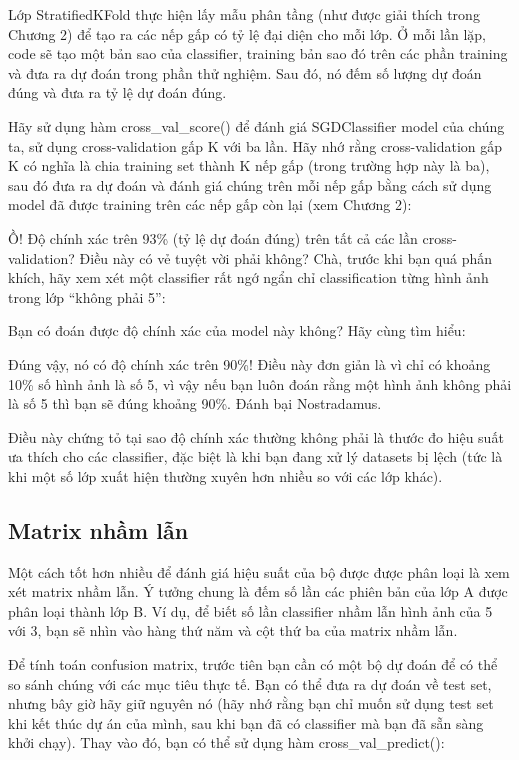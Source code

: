 Lớp StratifiedKFold thực hiện lấy mẫu phân tầng (như được giải thích trong Chương 2) để tạo ra các nếp gấp có tỷ lệ đại diện cho mỗi lớp. Ở mỗi lần lặp, code sẽ tạo một bản sao của classifier, training bản sao đó trên các phần training và đưa ra dự đoán trong phần thử nghiệm. Sau đó, nó đếm số lượng dự đoán đúng và đưa ra tỷ lệ dự đoán đúng.

Hãy sử dụng hàm cross\_val\_score() để đánh giá SGDClassifier model của chúng ta, sử dụng cross-validation gấp K với ba lần. Hãy nhớ rằng cross-validation gấp K có nghĩa là chia training set thành K nếp gấp (trong trường hợp này là ba), sau đó đưa ra dự đoán và đánh giá chúng trên mỗi nếp gấp bằng cách sử dụng model đã được training trên các nếp gấp còn lại (xem Chương 2):

Ồ! Độ chính xác trên 93\% (tỷ lệ dự đoán đúng) trên tất cả các lần cross-validation? Điều này có vẻ tuyệt vời phải không? Chà, trước khi bạn quá phấn khích, hãy xem xét một classifier rất ngớ ngẩn chỉ classification từng hình ảnh trong lớp “không phải 5”:

Bạn có đoán được độ chính xác của model này không? Hãy cùng tìm hiểu:

Đúng vậy, nó có độ chính xác trên 90\%! Điều này đơn giản là vì chỉ có khoảng 10\% số hình ảnh là số 5, vì vậy nếu bạn luôn đoán rằng một hình ảnh không phải là số 5 thì bạn sẽ đúng khoảng 90\%. Đánh bại Nostradamus.

Điều này chứng tỏ tại sao độ chính xác thường không phải là thước đo hiệu suất ưa thích cho các classifier, đặc biệt là khi bạn đang xử lý datasets bị lệch (tức là khi một số lớp xuất hiện thường xuyên hơn nhiều so với các lớp khác).

\subsection{Matrix nhầm lẫn}

Một cách tốt hơn nhiều để đánh giá hiệu suất của bộ được được phân loại là xem xét matrix nhầm lẫn. Ý tưởng chung là đếm số lần các phiên bản của lớp A được phân loại thành lớp B. Ví dụ, để biết số lần classifier nhầm lẫn hình ảnh của 5 với 3, bạn sẽ nhìn vào hàng thứ năm và cột thứ ba của matrix nhầm lẫn.

Để tính toán confusion matrix, trước tiên bạn cần có một bộ dự đoán để có thể so sánh chúng với các mục tiêu thực tế. Bạn có thể đưa ra dự đoán về test set, nhưng bây giờ hãy giữ nguyên nó (hãy nhớ rằng bạn chỉ muốn sử dụng test set khi kết thúc dự án của mình, sau khi bạn đã có classifier mà bạn đã sẵn sàng khởi chạy). Thay vào đó, bạn có thể sử dụng hàm cross\_val\_predict():

